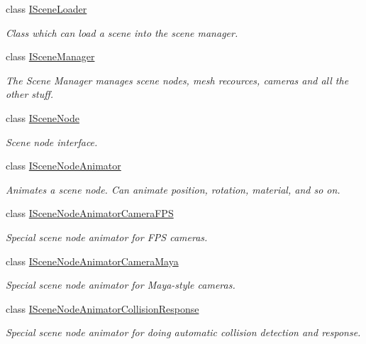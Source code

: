 \begin{DoxyCompactItemize}
class \hyperlink{classirr_1_1scene_1_1ISceneLoader}{I\+Scene\+Loader}
\begin{DoxyCompactList}\small\item\em Class which can load a scene into the scene manager. \end{DoxyCompactList}\item 
class \hyperlink{classirr_1_1scene_1_1ISceneManager}{I\+Scene\+Manager}
\begin{DoxyCompactList}\small\item\em The Scene Manager manages scene nodes, mesh recources, cameras and all the other stuff. \end{DoxyCompactList}\item 
class \hyperlink{classirr_1_1scene_1_1ISceneNode}{I\+Scene\+Node}
\begin{DoxyCompactList}\small\item\em Scene node interface. \end{DoxyCompactList}\item 
class \hyperlink{classirr_1_1scene_1_1ISceneNodeAnimator}{I\+Scene\+Node\+Animator}
\begin{DoxyCompactList}\small\item\em Animates a scene node. Can animate position, rotation, material, and so on. \end{DoxyCompactList}\item 
class \hyperlink{classirr_1_1scene_1_1ISceneNodeAnimatorCameraFPS}{I\+Scene\+Node\+Animator\+Camera\+F\+PS}
\begin{DoxyCompactList}\small\item\em Special scene node animator for F\+PS cameras. \end{DoxyCompactList}\item 
class \hyperlink{classirr_1_1scene_1_1ISceneNodeAnimatorCameraMaya}{I\+Scene\+Node\+Animator\+Camera\+Maya}
\begin{DoxyCompactList}\small\item\em Special scene node animator for Maya-\/style cameras. \end{DoxyCompactList}\item 
class \hyperlink{classirr_1_1scene_1_1ISceneNodeAnimatorCollisionResponse}{I\+Scene\+Node\+Animator\+Collision\+Response}
\begin{DoxyCompactList}\small\item\em Special scene node animator for doing automatic collision detection and response. \end{DoxyCompactList}\item 

\end{DoxyCompactItemize}
